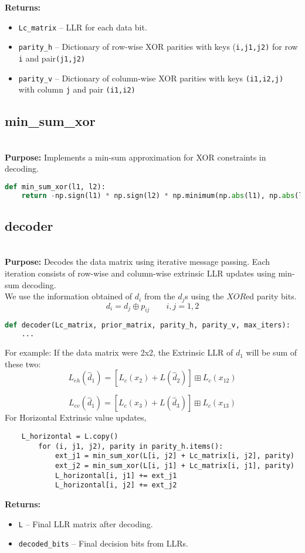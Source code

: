 \documentclass[12pt]{amsart}
\theoremstyle{plain}
\theoremstyle{definition}
\theoremstyle{remark}
\begin{document}
\textbf{Returns:}
\begin{itemize}
  \item \texttt{Lc\_matrix} -- LLR for each data bit.
  \item \texttt{parity\_h} -- Dictionary of row-wise XOR parities with keys (\texttt{i,j1,j2)} for row \texttt{i} and pair\texttt{(j1,j2)}
  \item \texttt{parity\_v} -- Dictionary of column-wise XOR parities with keys \texttt{(i1,i2,j)} with column \texttt{j} and pair \texttt{(i1,i2)}
\end{itemize}

\subsection{min\_sum\_xor}\mbox{}\\

\textbf{Purpose:} Implements a min-sum approximation for XOR constraints in decoding.

\begin{lstlisting}[language=Python]
def min_sum_xor(l1, l2):
    return -np.sign(l1) * np.sign(l2) * np.minimum(np.abs(l1), np.abs(l2))
\end{lstlisting}

\subsection{decoder}\mbox{}\\

\textbf{Purpose:} Decodes the data matrix using iterative message passing. Each iteration consists of row-wise and column-wise extrinsic LLR updates using min-sum decoding.\\
We use the information obtained of $d_i$ from the $d_j$s using the $XOR$ed parity bits. \[
d_i = d_j \oplus p_{ij} \qquad i,j = 1,2
\]
\begin{lstlisting}[language=Python]
def decoder(Lc_matrix, prior_matrix, parity_h, parity_v, max_iters):
    ...
\end{lstlisting}
For example: If the data matrix were 2x2, the Extrinsic LLR of $d_1$ will be sum of these two: \[
L_{eh}(\hat{d}_1) = \left[ L_c(x_2) + L(\hat{d}_2) \right] \boxplus L_c(x_{12})
\]

\[
L_{ev}(\hat{d}_1) = \left[ L_c(x_3) + L(\hat{d}_3) \right] \boxplus L_c(x_{13})
\]
For Horizontal Extrinsic value updates,
\begin{lstlisting}
    L_horizontal = L.copy()
        for (i, j1, j2), parity in parity_h.items():
            ext_j1 = min_sum_xor(L[i, j2] + Lc_matrix[i, j2], parity)
            ext_j2 = min_sum_xor(L[i, j1] + Lc_matrix[i, j1], parity)
            L_horizontal[i, j1] += ext_j1
            L_horizontal[i, j2] += ext_j2

\end{lstlisting}
\textbf{Returns:}
\begin{itemize}
  \item \texttt{L} -- Final LLR matrix after decoding.
  \item \texttt{decoded\_bits} -- Final decision bits from LLRs.
\end{itemize}
\end{document}

